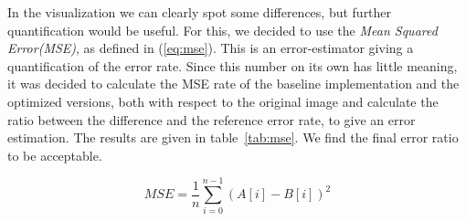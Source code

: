 In the visualization we can clearly spot some differences, but further quantification would be useful. For this, we decided to use the \emph{Mean Squared Error(MSE)}, as defined in (\ref{eq:mse}). This is an error-estimator giving a quantification of the error rate. Since this number on its own has little meaning, it was decided to calculate the MSE rate of the baseline implementation and the optimized versions, both with respect to the original image and calculate the ratio between the difference and the reference error rate, to give an error estimation. The results are given in table~\ref{tab:mse}. We find the final error ratio to be acceptable.

\begin{equation}
    MSE = \frac{1}{n} \sum_{i=0}^{n-1} (A[i] - B[i])^{2}
    \label{eq:mse}
\end{equation}